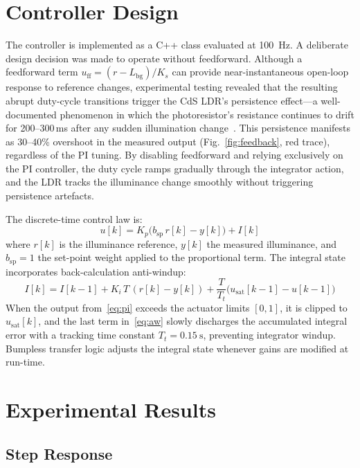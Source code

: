 \documentclass[10pt,twocolumn]{article}
\begin{document}
\section{Controller Design}

The controller is implemented as a C++ class evaluated at \SI{100}{\hertz}. A deliberate design decision was made to operate without feedforward. Although a feedforward term $u_\mathrm{ff} = (r - L_\mathrm{bg})/K_s$ can provide near-instantaneous open-loop response to reference changes, experimental testing revealed that the resulting abrupt duty-cycle transitions trigger the CdS LDR's persistence effect---a well-documented phenomenon in which the photoresistor's resistance continues to drift for 200--300\,ms after any sudden illumination change~\cite{ldr}. This persistence manifests as 30--40\% overshoot in the measured output (Fig.~\ref{fig:feedback}, red trace), regardless of the PI tuning. By disabling feedforward and relying exclusively on the PI controller, the duty cycle ramps gradually through the integrator action, and the LDR tracks the illuminance change smoothly without triggering persistence artefacts.

The discrete-time control law is:
\begin{equation}
  u[k] = K_p\bigl(b_\mathrm{sp}\,r[k] - y[k]\bigr) + I[k]
  \label{eq:pi}
\end{equation}
where $r[k]$ is the illuminance reference, $y[k]$ the measured illuminance, and $b_\mathrm{sp} = 1$ the set-point weight applied to the proportional term. The integral state incorporates back-calculation anti-windup:
\begin{equation}
  I[k] = I[k\!-\!1] + K_i\,T\,(r[k]\!-\!y[k]) + \frac{T}{T_t}\bigl(u_\mathrm{sat}[k\!-\!1]\!-\!u[k\!-\!1]\bigr)
  \label{eq:aw}
\end{equation}
When the output from~\eqref{eq:pi} exceeds the actuator limits $[0, 1]$, it is clipped to $u_\mathrm{sat}[k]$, and the last term in~\eqref{eq:aw} slowly discharges the accumulated integral error with a tracking time constant $T_t = \SI{0.15}{\second}$, preventing integrator windup. Bumpless transfer logic adjusts the integral state whenever gains are modified at run-time.

\section{Experimental Results}

\subsection{Step Response}
\end{document}
